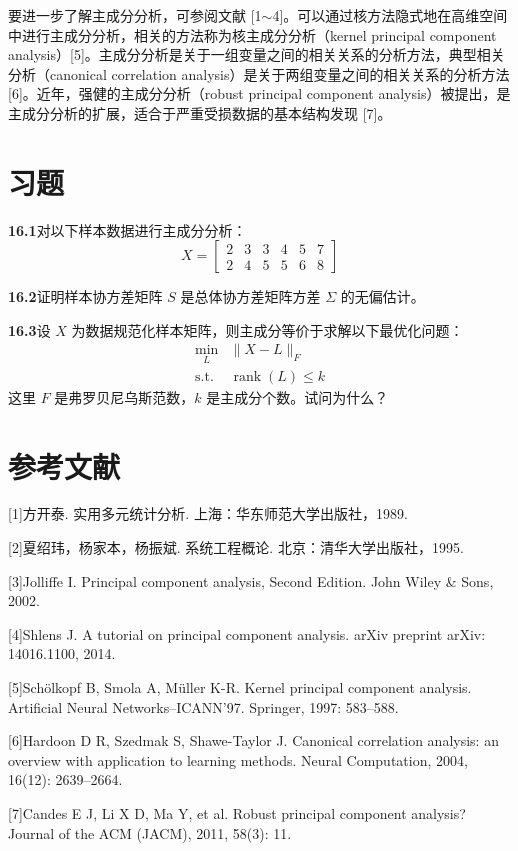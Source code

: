 \documentclass[UTF8,12pt,a4paper,fontset=fandol]{ctexart}
\begin{document}
要进一步了解主成分分析，可参阅文献 [1$\sim$4]。可以通过核方法隐式地在高维空间中进行主成分分析，相关的方法称为核主成分分析（kernel principal component analysis）[5]。主成分分析是关于一组变量之间的相关关系的分析方法，典型相关分析（canonical correlation analysis）是关于两组变量之间的相关关系的分析方法 [6]。近年，强健的主成分分析（robust principal component analysis）被提出，是主成分分析的扩展，适合于严重受损数据的基本结构发现 [7]。

\section*{习题}

\noindent\textbf{16.1}\quad 对以下样本数据进行主成分分析：
\[
X=
\begin{bmatrix}
2 & 3 & 3 & 4 & 5 & 7\\
2 & 4 & 5 & 5 & 6 & 8
\end{bmatrix}
\]

\noindent\textbf{16.2}\quad 证明样本协方差矩阵 $S$ 是总体协方差矩阵方差 $\Sigma$ 的无偏估计。

\noindent\textbf{16.3}\quad 设 $X$ 为数据规范化样本矩阵，则主成分等价于求解以下最优化问题：
\[
\begin{array}{ll}
\displaystyle\min_L & \|X-L\|_F\\[0.4em]
\mathrm{s.t.} & \operatorname{rank}(L)\leqslant k
\end{array}
\]
这里 $F$ 是弗罗贝尼乌斯范数，$k$ 是主成分个数。试问为什么？

\section*{参考文献}

[1]\quad 方开泰. 实用多元统计分析. 上海：华东师范大学出版社，1989.

[2]\quad 夏绍玮，杨家本，杨振斌. 系统工程概论. 北京：清华大学出版社，1995.

[3]\quad Jolliffe I. Principal component analysis, Second Edition. John Wiley \& Sons, 2002.

[4]\quad Shlens J. A tutorial on principal component analysis. arXiv preprint arXiv: 14016.1100, 2014.

[5]\quad Schölkopf B, Smola A, Müller K-R. Kernel principal component analysis. Artificial Neural Networks--ICANN'97. Springer, 1997: 583--588.

[6]\quad Hardoon D R, Szedmak S, Shawe-Taylor J. Canonical correlation analysis: an overview with application to learning methods. Neural Computation, 2004, 16(12): 2639--2664.

[7]\quad Candes E J, Li X D, Ma Y, et al. Robust principal component analysis? Journal of the ACM (JACM), 2011, 58(3): 11.
\end{document}
